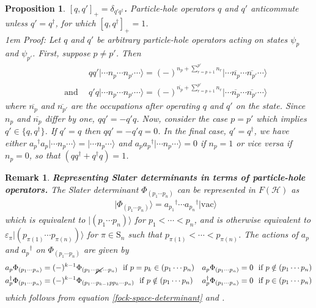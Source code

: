 \documentclass[11pt,fleqn]{article}
\renewcommand{\d}{\delta}    %
\newcommand{\e}{\varepsilon} %
\newcommand{\F}{\Phi}        %
\newcommand{\y}{\psi}        %
\newcommand{\dg}{\ensuremath{^\dagger}}
\newcommand{\ol}[1]{\ensuremath{\overline{#1}}}
\newcommand{\vac}{\ensuremath{\mathrm{vac}}}
\newcommand{\cd}{\ensuremath{\cdots}}
\newcommand{\bmit}[1]{{\bfseries\itshape\mathversion{bold}#1}}
\newcommand{\mc}[1]{\ensuremath{\mathcal{#1}}}
\newcommand{\mr}[1]{\ensuremath{\mathrm{#1}}}
\newcommand{\kt}[1]{\ensuremath{|#1\rangle}}
\theoremstyle{mystyle}
\newtheorem{rmk}{Remark}[section]
\newtheorem{pro}{Proposition}[section]
\numberwithin{equation}{section}
\begin{document}
\begin{pro}
\label{particle-hole-commutation-rules}
\bmit{$[q,q']_+=\d_{q'q\dg}$.}
\textit{Particle-hole operators $q$ and $q'$ anticommute unless $q'=q\dg$, for which $[q,q\dg]_+=1$.}
\\\hangindent1em
Proof:
Let $q$ and $q'$ be arbitrary particle-hole operators acting on states $\y_p$ and $\y_{p'}$.
First, suppose $p\neq p'$.
Then
\begin{align*}
&&
&
  qq'\kt{\cd n_p\cd n_{p'}\cd}
=
  (-)^{n_p+\sum_{r=p+1}^{p'}n_r}\kt{\cd\ol{n_p}\cd\ol{n_{p'}}\cd}
\\
&&
 \text{and}\ \ 
&
  q'q\kt{\cd n_p\cd n_{p'}\cd}
=
  (-)^{\ol{n_p}+\sum_{r=p+1}^{p'}n_r}\kt{\cd\ol{n_p}\cd\ol{n_{p'}}\cd}
\end{align*}
where $\ol{n_p}$ and $\ol{n_{p'}}$ are the occupations after operating $q$ and $q'$ on the state.
Since $n_p$ and $\ol{n_p}$ differ by one, $qq'=-q'q$.
Now, consider the case $p=p'$ which implies $q'\in\{q,q\dg\}$.
If $q'=q$ then $qq'=-q'q=0$.
In the final case, $q'=q\dg$, we have either $a_p\dg a_p\kt{\cd n_p\cd}=\kt{\cd n_p\cd}$ and $a_pa_p\dg\kt{\cd n_p\cd}=0$ if $n_p=1$ or vice versa if $n_p=0$, so that $(qq\dg+q\dg q)=1$.
\end{pro}

\begin{rmk}
\label{fock-space-slater-determinants}
\bmit{Representing Slater determinants in terms of particle-hole operators.}
The Slater determinant $\F_{(p_1\cd p_n)}$ can be represented in $F(\mc{H})$ as
\begin{align}
&&
\label{fock-space-determinant}
  \kt{\F_{(p_1\cd p_n)}}
=
  a_{p_1}\dg\cd a_{p_n}\dg\kt{\vac}
\end{align}
which is equivalent to $\kt{(p_1\cd p_n)}$ for $p_1<\cd<p_n$, and is otherwise equivalent to $\e_\pi\kt{(p_{\pi(1)}\cd p_{\pi(n)})}$ for $\pi\in\mr{S}_n$ such that $p_{\pi(1)}<\cd<p_{\pi(n)}$.
The actions of $a_p$ and $a_p\dg$ on $\F_{(p_1\cd p_n)}$ are given by
\begin{align}
\label{determinant-annihilation}
&
  a_p\F_{(p_1\cd p_n)}
=
  (-)^{k-1}
  \F_{(p_1\cd \cancel{p_k}\cd p_n)}
\ \ \text{if $p=p_k\in(p_1\cd p_n)$}
&&
  a_p\F_{(p_1\cd p_n)}
=
  0
\ \ \text{if $p\notin(p_1\cd p_n)$}
\\
\label{determinant-creation}
&
  a_p\dg\F_{(p_1\cd p_n)}
=
  (-)^{k-1}
  \F_{(p_1\cd p_{k-1}pp_k\cd p_n)}
\ \ \text{if $p\notin(p_1\cd p_n)$}
&&
  a_p\dg\F_{(p_1\cd p_n)}
=
  0
\ \ \text{if $p\in(p_1\cd p_n)$}
\end{align}
which follows from equation \ref{fock-space-determinant} and .
\end{rmk}
\end{document}
